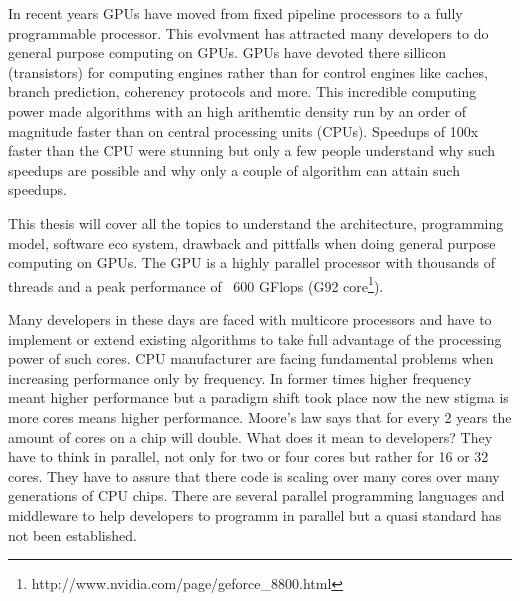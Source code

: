 


In recent years \glspl{GPU} have moved from fixed pipeline  processors to a 
fully programmable processor. This evolvment
has attracted many developers to do general purpose computing on GPUs.
 \glspl{GPU} have devoted there sillicon (transistors) for computing engines
rather than for control engines like caches, branch prediction, coherency
protocols and more. This incredible computing power made algorithms with an high
arithemtic density run by an order of magnitude faster than on central
processing units (CPUs). Speedups of 100x faster than the CPU were stunning but
only a few people understand why such speedups are possible and why only a
couple of algorithm can attain such speedups.

This thesis will cover all the topics to understand the architecture,
programming model, software eco system, drawback and pittfalls when doing
general purpose computing on GPUs. The \gls{GPU} is a highly parallel processor with
thousands of threads and a peak performance of ~600 GFlops (G92
core\footnote{http://www.nvidia.com/page/geforce\_8800.html}).

Many developers in these days are faced with multicore processors and have to
implement or extend existing algorithms to take full advantage of the
processing power of such cores. CPU manufacturer are facing fundamental problems
when increasing performance only by frequency. In former times higher frequency
meant higher performance but a paradigm shift took place now the new stigma is
more cores means higher performance. Moore's law says that for every 2 years the
amount of cores on a chip will double. What does it mean to developers? They
have to think in parallel, not only for two or four cores but rather for 16 or
32 cores. They have to assure that there code is scaling over many cores over
many generations of CPU chips. There are several parallel programming languages
and middleware to help developers to programm in parallel but a quasi standard
has not been established.

